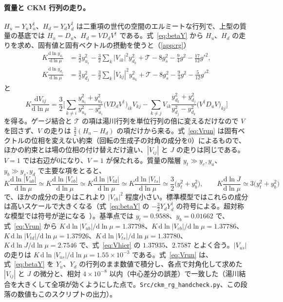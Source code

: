 \documentclass[a4paper,10pt]{ltjsarticle}
\newcommand{\dd}{\mathrm{d}}
\begin{document}
\paragraph{質量と CKM 行列の走り。}$H_u=Y_uY_u^\dagger$、$H_d=Y_dY_d^\dagger$ は二重項の世代の空間のエルミートな行列で、上型の質量の基底では $H_u=D_u$、$H_d=VD_dV^\dagger$ である。式~\eqref{eq:betaY} から $H_u$、$H_d$ の走りを求め、固有値と固有ベクトルの摂動を使うと（\ref{app:rg}）
\begin{equation}
\begin{aligned}
K\frac{\dd\ln y_{u_i}}{\dd\ln\mu}&=\frac32y_{u_i}^2-\frac32\sum_k|V_{ik}|^2y_{d_k}^2+\mathcal T-8g_s^2-\frac94g^2-\frac{17}{12}g'^2,\\
K\frac{\dd\ln y_{d_j}}{\dd\ln\mu}&=\frac32y_{d_j}^2-\frac32\sum_k|V_{kj}|^2y_{u_k}^2+\mathcal T-8g_s^2-\frac94g^2-\frac5{12}g'^2
\end{aligned}
\label{eq:yrun}
\end{equation}
と
\begin{equation}
K\frac{\dd V_{ij}}{\dd\ln\mu}=\frac32\Biggl[\sum_{k\ne i}\frac{y_{u_i}^2+y_{u_k}^2}{y_{u_k}^2-y_{u_i}^2}\bigl(VD_dV^\dagger\bigr)_{ik}V_{kj}
-\sum_{k\ne j}V_{ik}\frac{y_{d_k}^2+y_{d_j}^2}{y_{d_j}^2-y_{d_k}^2}\bigl(V^\dagger D_uV\bigr)_{kj}\Biggr]
\label{eq:Vrun}
\end{equation}
を得る。ゲージ結合と $\mathcal T$ の項は湯川行列を単位行列の倍に変えるだけなので $V$ を回さず、$V$ の走りは $\frac32(H_u-H_d)$ の項だけから来る。式~\eqref{eq:Vrun} は固有ベクトルの位相を変えない約束（回転の生成子の対角の成分を0）によるもので、ほかの約束とは場の位相の付け替えだけ違い、$|V_{ij}|$ と $J$ の走りは同じである。$V=1$ では右辺が0になり、$V=1$ が保たれる。質量の階層 $y_t\gg y_c,y_u$、$y_b\gg y_s,y_d$ で主要な項をとると、
\begin{equation}
K\frac{\dd\ln|V_{ub}|}{\dd\ln\mu}\simeq K\frac{\dd\ln|V_{cb}|}{\dd\ln\mu}\simeq K\frac{\dd\ln|V_{td}|}{\dd\ln\mu}\simeq K\frac{\dd\ln|V_{ts}|}{\dd\ln\mu}\simeq\frac32\bigl(y_t^2+y_b^2\bigr),\qquad
K\frac{\dd\ln J}{\dd\ln\mu}\simeq3\bigl(y_t^2+y_b^2\bigr)
\label{eq:Vhier}
\end{equation}
で、ほかの成分の走りはこれより $|V_{cb}|^2$ 程度小さい。標準模型ではこれらの成分は高いスケールで大きくなる（式~\eqref{eq:betaY} の $-\frac32Y_dY_d^\dagger$ の符号による。超対称な模型では符号が逆になる~\cite{babu87,bhmp99}）。基準点では $y_t=0.9588$、$y_b=0.01662$ で、式~\eqref{eq:Vrun} から $K\,\dd\ln|V_{ub}|/\dd\ln\mu=1.37798$、$K\,\dd\ln|V_{cb}|/\dd\ln\mu=1.37786$、$K\,\dd\ln|V_{td}|/\dd\ln\mu=1.37926$、$K\,\dd\ln|V_{ts}|/\dd\ln\mu=1.37780$、$K\,\dd\ln J/\dd\ln\mu=2.7546$ で、式~\eqref{eq:Vhier} の $1.37935$、$2.7587$ とよく合う。$|V_{us}|$ の走りは $K\,\dd\ln|V_{us}|/\dd\ln\mu=1.55\times10^{-3}$ である。式~\eqref{eq:Vrun} は、式~\eqref{eq:betaY} を $Y_u$、$Y_d$ の行列のまま数値で積分し、各点で対角化して求めた $|V_{ij}|$ と $J$ の微分と、相対 $4\times10^{-8}$ 以内（中心差分の誤差）で一致した（湯川結合を大きくして全項が効くようにした点で。\texttt{Src/ckm\_rg\_handcheck.py}、この段落の数値もこのスクリプトの出力）。
\end{document}
